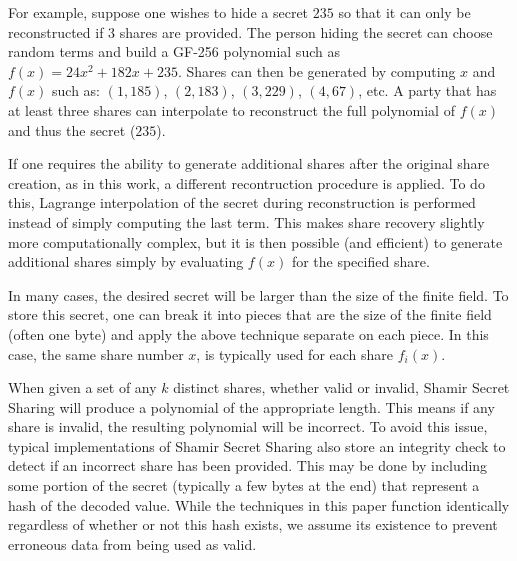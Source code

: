 For example, suppose one wishes to hide a secret $235$ so that it can only be
reconstructed if $3$ shares are provided.   The person hiding the secret can 
choose random terms and build a GF-256 polynomial such as $f(x) = 24x^2 + 
182x + 235$.   Shares can then be generated by computing $x$ and $f(x)$ such
as: $(1,185)$, $(2, 183)$, $(3, 229)$, $(4,67)$, etc.   A party that has at 
least three shares can interpolate to reconstruct the full polynomial of
$f(x)$ and thus the secret ($235$).

If one requires the ability to generate additional shares
after the original share creation, as in this work, a different recontruction
procedure is applied.   To do this, Lagrange interpolation of the secret during 
reconstruction is performed instead of simply computing the last term.   This 
makes share recovery slightly more computationally
complex, but it is then possible (and efficient) to generate additional shares
simply by evaluating $f(x)$ for the specified share.

In many cases, the desired secret will be larger than the size of the finite
field.   To store this secret, one can break it into pieces that are the size
of the finite field (often one byte) and apply the above technique separate on 
each piece.  In this case, the same share number $x$, is typically used for 
each share $f_i(x)$.

When given a set of any $k$ distinct shares, whether valid or invalid, Shamir
Secret Sharing will produce a polynomial of the appropriate length.
This means if any share is invalid, the resulting polynomial will be 
incorrect.   To avoid this issue, 
typical implementations of Shamir Secret Sharing also store an integrity check
to detect if an incorrect share has been provided.   This may be
done by including some portion of the secret (typically a few bytes at the 
end) that represent a hash of the decoded value.  While the techniques
in this paper function identically regardless of whether or not this
hash exists, we assume its existence to prevent erroneous data from
being used as valid.   




